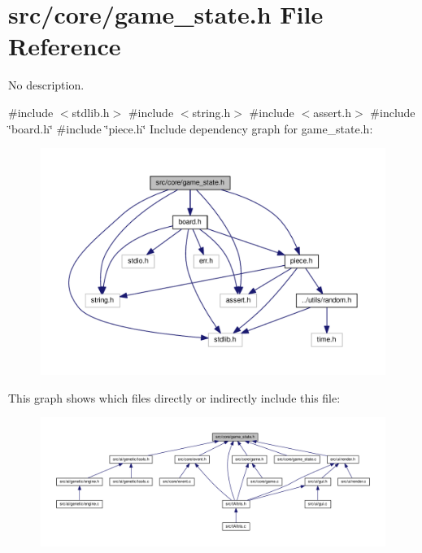\section{src/core/game\+\_\+state.h File Reference}
\label{game__state_8h}


No description.  


{\ttfamily \#include $<$stdlib.\+h$>$}\newline
{\ttfamily \#include $<$string.\+h$>$}\newline
{\ttfamily \#include $<$assert.\+h$>$}\newline
{\ttfamily \#include \char`\"{}board.\+h\char`\"{}}\newline
{\ttfamily \#include \char`\"{}piece.\+h\char`\"{}}\newline
Include dependency graph for game\+\_\+state.\+h\+:
\nopagebreak
\begin{figure}[H]
\begin{center}
\leavevmode
\includegraphics[width=350pt]{game__state_8h__incl}
\end{center}
\end{figure}
This graph shows which files directly or indirectly include this file\+:
\nopagebreak
\begin{figure}[H]
\begin{center}
\leavevmode
\includegraphics[width=350pt]{game__state_8h__dep__incl}
\end{center}
\end{figure}
